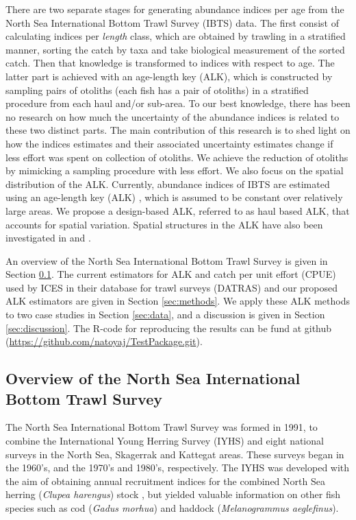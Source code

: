 \documentclass[a4paper 12pt]{article}
\numberwithin{equation}{section}
\begin{document}
There are two separate stages for generating abundance indices per age from the North Sea International Bottom Trawl Survey (IBTS) data.  The first consist of calculating indices per \textit{length} class, which are obtained by trawling in a stratified manner, sorting the catch by taxa and take biological measurement of the sorted catch. Then that knowledge is transformed to indices with respect to age. The latter part is achieved with an age-length key (ALK), which is constructed by sampling pairs of otoliths (each fish has a pair of otoliths)  in a stratified procedure from each haul and/or sub-area. To our best knowledge, there has been no research on how much the uncertainty of the abundance indices is related to these two distinct parts. The main contribution of this research is to shed light on how the indices estimates and their associated uncertainty estimates change if less effort was spent on collection of otoliths. We achieve the reduction of otoliths by mimicking a sampling procedure with less effort. We also focus on the spatial distribution of the ALK. Currently, abundance indices of IBTS are estimated using an age-length key (ALK) \citep{fridriksson1934calculation}, which is assumed to be constant over relatively large areas. We propose a design-based ALK, referred to as haul based ALK, that accounts for spatial variation. Spatial structures in the ALK have also been investigated in \citet{berg2012spatial} and  \citet{hirst2012bayesian}. 

An  overview of the  North Sea International Bottom Trawl Survey is given in Section \ref{overview}. The current estimators for ALK and catch per unit effort (CPUE) used by ICES in their database for trawl surveys (DATRAS) and our proposed ALK estimators are given in Section \ref{sec:methods}. We apply these ALK methods to two case studies in Section  \ref{sec:data}, and a discussion is given in Section \ref{sec:discussion}. The R-code for reproducing the results can be fund at github (\href{https://github.com/natoyaj/TestPackage.git}{https://github.com/natoyaj/TestPackage.git}).
 

\subsection{Overview of the North Sea International Bottom Trawl Survey}
\label{overview}
\indent The North Sea International Bottom Trawl Survey was formed in 1991, to combine the International Young Herring Survey (IYHS) and eight national surveys in the North Sea, Skagerrak and Kattegat areas. These surveys began in the 1960's, and the 1970's and 1980's, respectively. The IYHS was developed with the aim of obtaining annual recruitment indices for the combined North Sea herring (\textit{Clupea harengus}) stock \citep{ICES2012}, but yielded valuable information on other fish species such as cod (\textit{Gadus morhua}) and haddock (\textit{Melanogrammus aeglefinus}).
\end{document}
